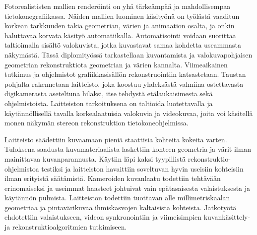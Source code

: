 \begin{abstractpage}[finnish]
Fotorealististen mallien renderöinti on yhä tärkeämpää ja mahdollisempaa tietokonegrafiikassa.
Näiden mallien luominen käsityönä on työlästä vaaditun korkean tarkkuuden takia geometrian, värien ja animaation osalta, ja onkin haluttavaa korvata käsityö automatiikalla.
Automatisointi voidaan suorittaa taltioimalla sisältö valokuvista, jotka kuvastavat samaa kohdetta useammasta näkymästä.
Tässä diplomityössä tarkastellaan kuvantamista ja valokuvapohjaisen geometrian rekonstruktiota geometrian ja värien kannalta.
Viimeaikainen tutkimus ja ohjelmistot grafiikkasisällön rekonstruointiin katsastetaan.
Taustan pohjalta rakennetaan laitteisto, joka koostuu yhdeksästä valmiina ostettavasta digikamerasta aseteltuna hilaksi, itse tehdystä etälaukaisimesta sekä ohjelmistoista.
Laitteiston tarkoituksena on taltioida luotettavalla ja käytännöllisellä tavalla korkealaatuisia valokuvia ja videokuvaa, joita voi käsitellä monen näkymän stereon rekonstruktion tietokoneohjelmissa.

Laitteisto säädettiin kuvaamaan pieniä staattisia kohteita kokeita varten.
Tuloksena saadusta kuvamateriaalista laskettiin kohteen geometria ja värit ilman mainittavaa kuvanparannusta.
Käytiin läpi kaksi tyypillistä rekonstruktio-ohjelmistoa testiksi ja laitteiston havaittiin soveltuvan hyvin useisiin kohteisiin ilman erityistä säätämistä.
Kameroiden kuvanlaatu todettiin tehtävään erinomaiseksi ja useimmat haasteet johtuivat vain epätasaisesta valaistuksesta ja käytännön pulmista.
Laitteiston todettiin tuottavan alle millimetriskaalan geometriaa ja pintavärikuvaa ihmiskasvojen kaltaisista kohteista.
Jatkotyötä ehdotettiin valaistukseen, videon synkronointiin ja viimeisimpien kuvankäsittely- ja rekonstruktioalgoritmien tutkimiseen.
\end{abstractpage}
